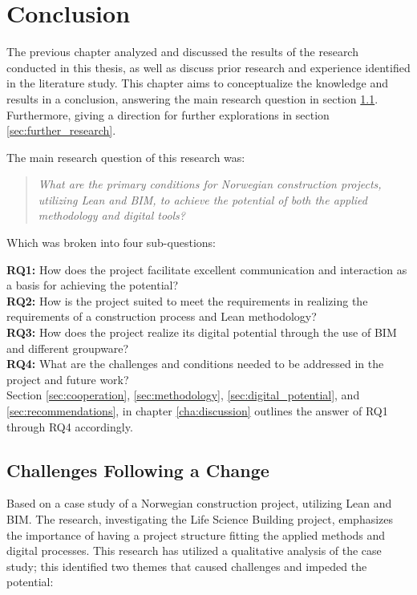 
\chapter{Conclusion} \label{cha:conclusion}
The previous chapter analyzed and discussed the results of the research conducted in this thesis, as well as discuss prior research and experience identified in the literature study. This chapter aims to conceptualize the knowledge and results in a conclusion, answering the main research question in section \ref{sec:rq1}. Furthermore, giving a direction for further explorations in section \ref{sec:further_research}.

\noindent The main research question of this research was: 
\begin{quote}
    \textit{What are the primary conditions for Norwegian construction projects, utilizing Lean and BIM, to achieve the potential of both the applied methodology and digital tools?} 
\end{quote}

\noindent Which was broken into four sub-questions:

{\noindent \bf RQ1:} How does the project facilitate excellent communication and interaction as a basis for achieving the potential? \\
{\bf RQ2:} How is the project suited to meet the requirements in realizing the requirements of a construction process and Lean methodology? \\
{\bf RQ3:} How does the project realize its digital potential through the use of BIM and different groupware? \\
{\bf RQ4:} What are the challenges and conditions needed to be addressed in the project and future work? \\

Section \ref{sec:cooperation}, \ref{sec:methodology}, \ref{sec:digital_potential}, and \ref{sec:recommendations}, in chapter \ref{cha:discussion} outlines the answer of RQ1 through RQ4 accordingly.

\section{Challenges Following a Change} \label{sec:rq1}
Based on a case study of a Norwegian construction project, utilizing Lean and BIM. The research, investigating the Life Science Building project, emphasizes the importance of having a project structure fitting the applied methods and digital processes. This research has utilized a qualitative analysis of the case study; this identified two themes that caused challenges and impeded the potential:

